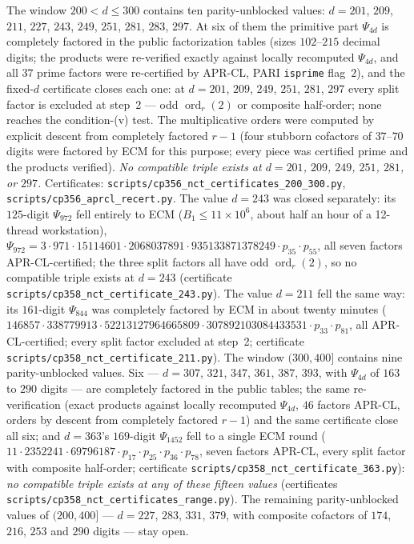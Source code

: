 \documentclass[11pt]{amsart}
\theoremstyle{plain}
\theoremstyle{definition}
\theoremstyle{remark}
\numberwithin{equation}{section}
\newcommand{\ord}{\operatorname{ord}}
\begin{document}
The window $200 < d \leq 300$ contains ten parity-unblocked values: $d = 201$, $209$, $211$, $227$, $243$, $249$, $251$, $281$, $283$, $297$. At six of them the primitive part $\Psi_{4d}$ is completely factored in the public factorization tables (sizes $102$--$215$ decimal digits; the products were re-verified exactly against locally recomputed $\Psi_{4d}$, and all $37$ prime factors were re-certified by APR-CL, PARI \texttt{isprime} flag~$2$), and the fixed-$d$ certificate closes each one: at $d = 201$, $209$, $249$, $251$, $281$, $297$ every split factor is excluded at step~2 --- odd $\ord_r(2)$ or composite half-order; none reaches the condition-(v) test. The multiplicative orders were computed by explicit descent from completely factored $r-1$ (four stubborn cofactors of $37$--$70$ digits were factored by ECM for this purpose; every piece was certified prime and the products verified). \emph{No compatible triple exists at $d = 201$, $209$, $249$, $251$, $281$, or $297$.} Certificates: \texttt{scripts/}\allowbreak\texttt{cp356\_nct\_certificates\_200\_300.py}, \texttt{scripts/}\allowbreak\texttt{cp356\_aprcl\_recert.py}. The value $d = 243$ was closed separately: its $125$-digit $\Psi_{972}$ fell entirely to ECM ($B_1 \leq 11{\times}10^6$, about half an hour of a 12-thread workstation), $\Psi_{972} = 3\cdot971\cdot15114601\cdot2068037891\cdot935133871378249\cdot p_{35}\cdot p_{55}$, all seven factors APR-CL-certified; the three split factors all have odd $\ord_r(2)$, so no compatible triple exists at $d = 243$ (certificate \texttt{scripts/}\allowbreak\texttt{cp358\_nct\_certificate\_243.py}). The value $d = 211$ fell the same way: its $161$-digit $\Psi_{844}$ was completely factored by ECM in about twenty minutes ($146857 \cdot 338779913 \cdot 52213127964665809 \cdot 307892103084433531 \cdot p_{33} \cdot p_{81}$, all APR-CL-certified; every split factor excluded at step~2; certificate \texttt{scripts/}\allowbreak\texttt{cp358\_nct\_certificate\_211.py}). The window $(300, 400]$ contains nine parity-unblocked values. Six --- $d = 307$, $321$, $347$, $361$, $387$, $393$, with $\Psi_{4d}$ of $163$ to $290$ digits --- are completely factored in the public tables; the same re-verification (exact products against locally recomputed $\Psi_{4d}$, $46$ factors APR-CL, orders by descent from completely factored $r - 1$) and the same certificate close all six; and $d = 363$'s $169$-digit $\Psi_{1452}$ fell to a single ECM round ($11 \cdot 2352241 \cdot 69796187 \cdot p_{17} \cdot p_{25} \cdot p_{36} \cdot p_{78}$, seven factors APR-CL, every split factor with composite half-order; certificate \texttt{scripts/}\allowbreak\texttt{cp358\_nct\_certificate\_363.py}): \emph{no compatible triple exists at any of these fifteen values} (certificates \texttt{scripts/}\allowbreak\texttt{cp358\_nct\_certificates\_range.py}). The remaining parity-unblocked values of $(200, 400]$ --- $d = 227$, $283$, $331$, $379$, with composite cofactors of $174$, $216$, $253$ and $290$ digits --- stay open.
\end{document}
